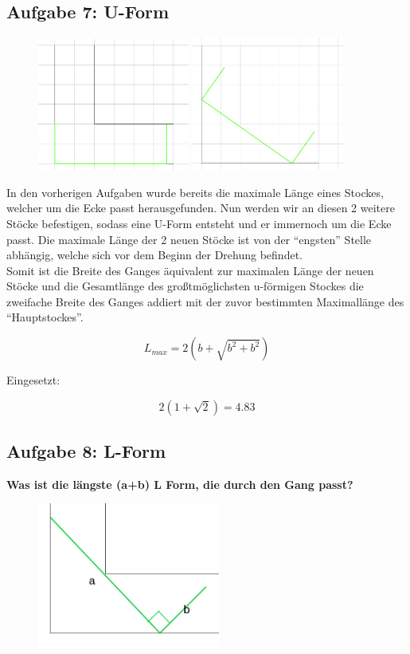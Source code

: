 \documentclass[a4paper,11pt]{article}
\begin{document}
\subsection{Aufgabe 7: U-Form}
\begin{figure}[H] 
        \centering
        \includegraphics[width=5cm]{img/A7_1.png}
        \includegraphics[width=5cm]{img/A7_2.png}
\end{figure}
In den vorherigen Aufgaben wurde bereits die maximale Länge eines Stockes, welcher um die Ecke passt herausgefunden. Nun werden wir an diesen 2 weitere Stöcke befestigen, sodass eine U-Form entsteht und er immernoch um die Ecke passt. Die maximale Länge der 2 neuen Stöcke ist von der “engsten” Stelle abhängig, welche sich vor dem Beginn der Drehung befindet.\\

Somit ist die Breite des Ganges äquivalent zur maximalen Länge der neuen Stöcke und die Gesamtlänge des großtmöglichsten u-förmigen Stockes die zweifache Breite des Ganges addiert mit der zuvor bestimmten Maximallänge des “Hauptstockes”.

\[ L_{max} = 2(b+\sqrt{b^2+b^2}) \]

Eingesetzt:

\[ 2(1+\sqrt{2})=4.83 \]

\subsection{Aufgabe 8: L-Form}
\textbf{Was ist die l\"angste (a+b) L Form, die durch den Gang passt?} \\

\begin{figure}[htbp] 
        \centering
        \includegraphics[width=6cm]{img/A8_1.png}
\end{figure}
\end{document}
